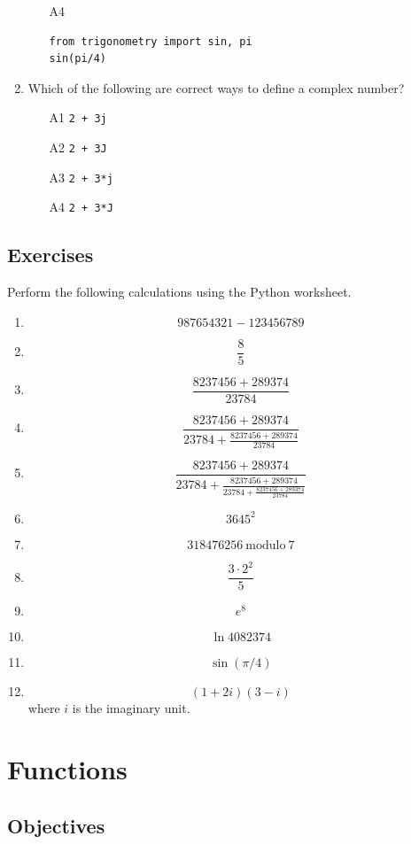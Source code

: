 \documentclass[article,A4,12pt]{llncs}
\begin{document}
\begin{enumerate}
\begin{enumerate}
\item[A4] 
\begin{verbatim}
from trigonometry import sin, pi
sin(pi/4)
\end{verbatim}
\end{enumerate}
\item Which of the following are correct ways to define a complex number?
\begin{enumerate}
\item[A1] {\tt 2 + 3j}
\item[A2] {\tt 2 + 3J}
\item[A3] {\tt 2 + 3*j}
\item[A4] {\tt 2 + 3*J}
\end{enumerate}
\end{enumerate}

\subsection{Exercises}
Perform the following calculations using the Python worksheet.
\begin{enumerate}
\item 
$$
  987654321 - 123456789
$$
\item 
$$
\frac{8}{5}
$$
\item 
$$
  \frac{8237456 + 289374}{23784}
$$ 
\item 
$$
  \frac{8237456 + 289374}{23784 + \frac{8237456 + 289374}{23784}}
$$ 
\item 
$$
  \frac{8237456 + 289374}{23784 + \frac{8237456 + 289374}{23784 + \frac{8237456 + 289374}{23784}}}
$$ 
\item 
$$
  3645^2
$$
\item 
$$
  318476256 \ \mbox{modulo} \ 7
$$
\item 
$$
  \frac{3\cdot 2^2}{5} 
$$
\item 
$$
  e^8
$$
\item 
$$
  \ln 4082374
$$
\item 
$$
  \sin(\pi / 4)
$$
\item 
$$
  (1 + 2i)(3 - i)
$$
where $i$ is the imaginary unit.
\end{enumerate}

\section{Functions}

\subsection{Objectives}
\end{document}

